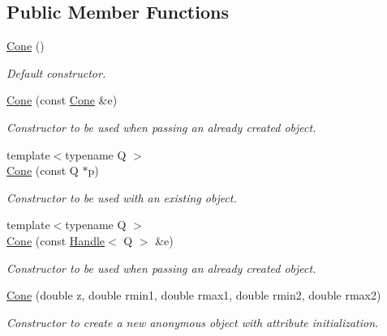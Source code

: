 \subsection*{Public Member Functions}
\begin{DoxyCompactItemize}
\item 
\hyperlink{class_d_d4hep_1_1_geometry_1_1_cone_ad9b37135d59ce513bbae5aa1452ec310}{Cone} ()
\begin{DoxyCompactList}\small\item\em Default constructor. \item\end{DoxyCompactList}\item 
\hyperlink{class_d_d4hep_1_1_geometry_1_1_cone_a573980801421cbe77876ca7c98d6991f}{Cone} (const \hyperlink{class_d_d4hep_1_1_geometry_1_1_cone}{Cone} \&e)
\begin{DoxyCompactList}\small\item\em Constructor to be used when passing an already created object. \item\end{DoxyCompactList}\item 
{\footnotesize template$<$typename Q $>$ }\\\hyperlink{class_d_d4hep_1_1_geometry_1_1_cone_ab7e9454721d7ef6094c712935933e598}{Cone} (const Q $\ast$p)
\begin{DoxyCompactList}\small\item\em Constructor to be used with an existing object. \item\end{DoxyCompactList}\item 
{\footnotesize template$<$typename Q $>$ }\\\hyperlink{class_d_d4hep_1_1_geometry_1_1_cone_ae7e6672c7841cd10b9812956b72ae140}{Cone} (const \hyperlink{class_d_d4hep_1_1_handle}{Handle}$<$ Q $>$ \&e)
\begin{DoxyCompactList}\small\item\em Constructor to be used when passing an already created object. \item\end{DoxyCompactList}\item 
\hyperlink{class_d_d4hep_1_1_geometry_1_1_cone_a88d9236d88f467a6a17b1b729cf54afa}{Cone} (double z, double rmin1, double rmax1, double rmin2, double rmax2)
\begin{DoxyCompactList}\small\item\em Constructor to create a new anonymous object with attribute initialization. \item\end{DoxyCompactList}\item 

\end{DoxyCompactItemize}

